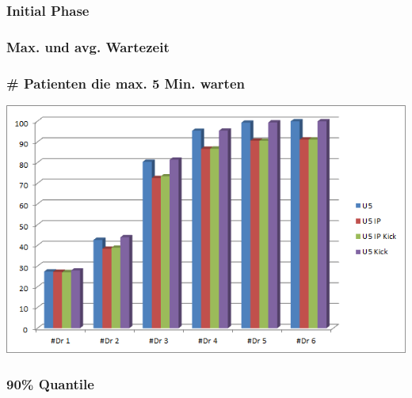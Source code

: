 \documentclass{beamer}
\begin{document}
\begin{frame}
	\frametitle{Initial Phase}
\end{frame}

\begin{frame}
	\frametitle{Max. und avg. Wartezeit}
\end{frame}

\begin{frame}
	\frametitle{\# Patienten die max. 5 Min. warten}
	\begin{center}
		\includegraphics[scale=0.6]{img/U5.png}
	\end{center}
\end{frame}



\begin{frame}
	\frametitle{90\% Quantile}
\end{frame}
\end{document}
